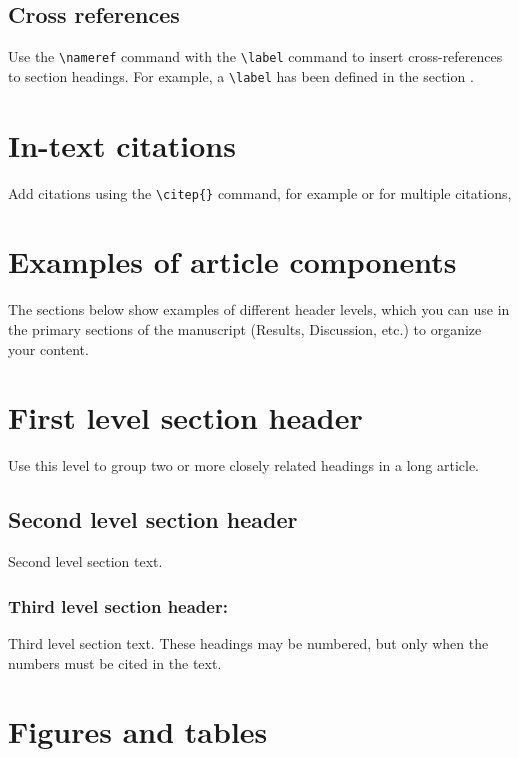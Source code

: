 \documentclass[10pt,twocolumn,twoside,lineno]{gsajnl}
\begin{document}
\subsection{Cross references}
Use the \verb|\nameref| command with the \verb|\label| command to insert cross-references to section headings. For example, a \verb|\label| has been defined in the section .

\section{In-text citations}

Add citations using the \verb|\citep{}| command, for example \citep{neher2013genealogies} or for multiple citations, \citep{neher2013genealogies, rodelsperger2014characterization,Falush16}

\section{Examples of article components}
\label{sec:examples}

The sections below show examples of different header levels, which you can use in the primary sections of the manuscript (Results, Discussion, etc.) to organize your content.

\section{First level section header}

Use this level to group two or more closely related headings in a long article.

\subsection{Second level section header}

Second level section text.

\subsubsection{Third level section header:}

Third level section text. These headings may be numbered, but only when the numbers must be cited in the text.

\section{Figures and tables}
\end{document}
